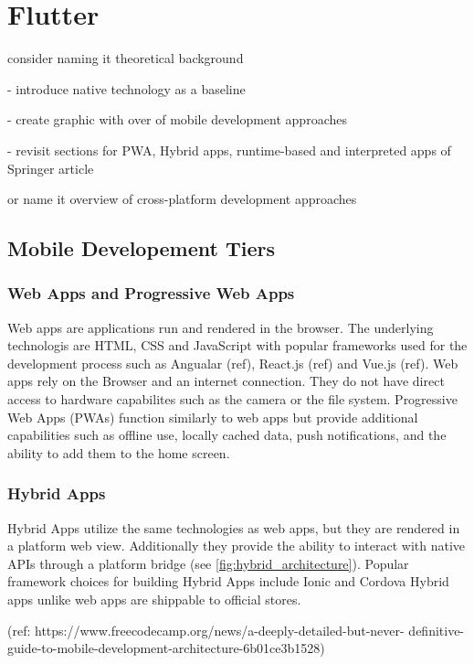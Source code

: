 \chapter{Flutter}
consider naming it theoretical background

- introduce native technology as a baseline

- create graphic with over of mobile development approaches

- revisit sections for PWA, Hybrid apps, runtime-based and interpreted apps of Springer article

or name it overview of cross-platform development approaches
\section{Mobile Developement Tiers} \label{section::other_architectures}
\subsection{Web Apps and Progressive Web Apps}
Web apps are applications run and rendered in the browser. The underlying technologis are HTML, CSS and JavaScript with popular frameworks 
used for the development process such as Angualar (ref), React.js (ref) and Vue.js (ref). Web apps rely on the Browser and an internet connection.
They do not have direct access to hardware capabilites such as the camera or the file system.
Progressive Web Apps (PWAs) function similarly to web apps but provide additional capabilities such as offline use, locally cached data, 
push notifications, and the ability to add them to the home screen.

\subsection{Hybrid Apps}
Hybrid Apps utilize the same technologies as web apps, but they are rendered in a platform web view. Additionally they provide the ability to 
interact with native APIs through a platform bridge (see \ref{fig:hybrid_architecture}). 
Popular framework choices for building Hybrid Apps include Ionic and Cordova 
Hybrid apps unlike web apps are shippable to official stores.


(ref: https://www.freecodecamp.org/news/a-deeply-detailed-but-never-
definitive-guide-to-mobile-development-architecture-6b01ce3b1528)

